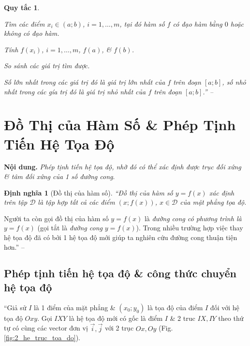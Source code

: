 \documentclass[oneside]{book}
\numberwithin{equation}{section}
\newtheorem{dinhnghia}{Định nghĩa}[section]
\newtheorem{quytac}{Quy tắc}
\begin{document}
\begin{quytac}
	\begin{enumerate*}
		\item Tìm các điểm $x_i\in(a;b)$, $i = 1,\ldots,m$, tại đó hàm số $f$ có đạo hàm bằng $0$ hoặc không có đạo hàm.
		\item Tính $f(x_i)$, $i = 1,\ldots,m$, $f(a)$, \& $f(b)$.
		\item So sánh các giá trị tìm được.
	\end{enumerate*}
	Số lớn nhất trong các giá trị đó là giá trị lớn nhất của $f$ trên đoạn $[a;b]$, số nhỏ nhất trong các gía trị đó là giá trị nhỏ nhất của $f$ trên đoạn $[a;b]$.'' -- \cite[p. 21]{SGK_Toan_12_giai_tich_nang_cao}
\end{quytac}


\section{Đồ Thị của Hàm Số \& Phép Tịnh Tiến Hệ Tọa Độ}
\textbf{Nội dung.} \textit{Phép tịnh tiến hệ tọa độ, nhờ đó có thể xác định được trục đối xứng \& tâm đối xứng của 1 số đường cong}.

\begin{dinhnghia}[Đồ thị của hàm số]
	``\emph{Đồ thị của hàm số} $y = f(x)$ xác định trên tập $\mathcal{D}$ là tập hợp tất cả các điểm $(x;f(x))$, $x\in\mathcal{D}$ của mặt phẳng tọa độ.
\end{dinhnghia}
Người ta còn gọi đồ thị của hàm số $y = f(x)$ là \textit{đường cong có phương trình là $y = f(x)$} (gọi tắt là \textit{đường cong} $y = f(x)$). Trong nhiều trường hợp việc thay hệ tọa độ đã có bởi 1 hệ tọa độ mới giúp ta nghiên cứu đường cong thuận tiện hơn.'' -- \cite[p. 24]{SGK_Toan_12_giai_tich_nang_cao}

\subsection{Phép tịnh tiến hệ tọa độ \& công thức chuyển hệ tọa độ}
``Giả sử $I$ là 1 điểm của mặt phẳng \& $(x_0;y_0)$ là tọa độ của điểm $I$ đối với hệ tọa độ $Oxy$. Gọi $IXY$ là hệ tọa độ mới có gốc là điểm $I$ \& 2 truc $IX,IY$ theo thứ tự có cùng các vector đơn vị $\vec{i},\vec{j}$ với 2 trục $Ox,Oy$ (Fig. \ref{fig:2_he_truc_toa_do}).
\end{document}
